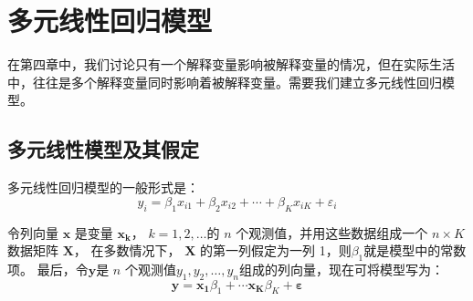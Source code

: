 
\chapter{多元线性回归模型}

在第四章中，我们讨论只有一个解释变量影响被解释变量的情况，但在实际生活中，往往是多个解释变量同时影响着被解释变量。需要我们建立多元线性回归模型。

\section{多元线性模型及其假定}

多元线性回归模型的一般形式是：
$$ y_{i}=\beta_{1} x_{i 1}+\beta_{2} x_{i 2}+\cdots+\beta_{K} x_{i K}+\varepsilon_{i} $$

令列向量 $ \boldsymbol{x} $ 是变量 $ \boldsymbol{x_k} $， $k=1, 2, \ldots $的 $ n $ 个观测值，并用这些数据组成一个 $ n \times K $数据矩阵 $ \boldsymbol{X} $， 
在多数情况下， $ \boldsymbol{X} $ 的第一列假定为一列 1，则$ \beta_1 $就是模型中的常数项。
最后，令$ \boldsymbol{y} $是 $ n $ 个观测值$ y_1, y_2, \ldots , y_n $组成的列向量，现在可将模型写为：
$$ \boldsymbol{y}=\boldsymbol{x_{1}} \beta_{1}+\cdots \boldsymbol{x_{K}} \beta_{K}+ \boldsymbol{\varepsilon} $$

